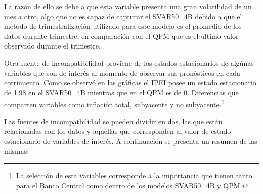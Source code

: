 \documentclass[
  letterpaper,
  DIV=11,
  numbers=noendperiod]{scrartcl}
\begin{document}
La razón de ello se debe a que esta variable presenta una gran
volatilidad de un mes a otro, algo que no es capaz de capturar el
SVAR50\_4B debido a que el método de trimestralización utilizado para
este modelo es el promedio de los datos durante trimestre, en
comparación con el QPM que es el último valor observado durante el
trimestre.

Otra fuente de incompatibilidad proviene de los estados estacionarios de
algúnas variables que son de interés al momento de observar sus
pronósticos en cada corrimiento. Como se observó en las gráficas el IPEI
posee un estado estacionario de 1.98 en el SVAR50\_4B mientras que en el
QPM es de 0. Diferencias que comparten variables como inflación total,
subyacente y no subyacente.\footnote{La selección de esta variables
  corresponde a la importancia que tienen tanto para el Banco Central
  como dentro de los modelos SVAR50\_4B y QPM.}

Las fuentes de incompatbilidad se pueden dividir en dos, las que están
relacionadas con los datos y aquellas que corresponden al valor de
estado estacionario de variables de interés. A continuación se presenta
un resumen de las mismas:
\end{document}
